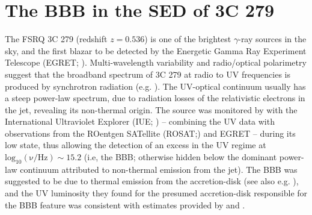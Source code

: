 \documentclass[twocolumn, tighten, twocolappendix]{aastex63}
\begin{document}
\section{The BBB in the SED of 3C 279}\label{sec:3C279}
The FSRQ 3C 279 (redshift $z = 0.536$) is one of the brightest $\gamma$-ray sources in the sky, and the first blazar to be detected by the Energetic Gamma Ray Experiment Telescope (EGRET; \cite{Kanbach_etal1988, Hartman_etal1992}). Multi-wavelength variability and radio/optical polarimetry suggest that the broadband spectrum of 3C 279 at radio to UV frequencies is produced by synchrotron radiation (e.g. \cite{Maraschi_etal1994, Hartman_1996}). The UV-optical continuum usually has a steep power-law spectrum, due to radiation losses of the relativistic electrons in the jet, revealing its non-thermal origin. The source was monitored by \cite{Pian_etal1999} with the International Ultraviolet Explorer (IUE; \cite{Nichols_Linsky_1996}) -- combining the UV data with observations from the ROentgen SATellite (ROSAT;\cite{Truemper_1993}) and EGRET -- during its low state, thus allowing the detection of an excess in the UV regime at $\mathrm{log_{10}(\nu/ Hz)}\sim 15.2$ (i.e, the BBB; otherwise hidden below the dominant power-law continuum attributed to non-thermal emission from the jet). The BBB was suggested to be due to thermal emission from the accretion-disk (see also e.g. \cite{Blaes_etal2001, Pal_etal2020}), and the UV luminosity they found for the presumed accretion-disk responsible for the BBB feature was consistent with estimates provided by \cite{Dermer_Schlickeiser_1993} and \cite{Sikora_etal1994}.
\end{document}
